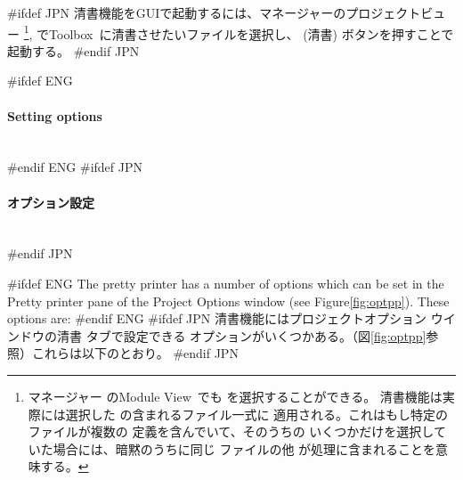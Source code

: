 \documentclass[\pformat,12pt]{article}
\newcommand{\Toolbox}{Toolbox}
\newcommand{\vdmModView}{\guicmd{Module View}}
\newcommand{\vdmModView}{\guicmd{モジュールビュー}}
\newcommand{\Toolbox}{Toolbox}
\newcommand{\vdmModView}{\guicmd{VDM View}}
\newcommand{\vdmModView}{\guicmd{VDMビュー}}
\newcommand{\subsubsubsection}[1]{\paragraph{#1}\mbox{}\\}
\newcommand{\guicmd}[1]{{\sf #1}}
\newcommand{\guicmd}[1]{{\gt #1}}
\begin{document}
#ifdef JPN
清書機能をGUIで起動するには、\guicmd{マネージャー}の\guicmd{プロジェクトビュー} %
\footnote{%
  \guicmd{マネージャー} の\vdmModView\ でも
  を選択することができる。
  清書機能は実際には選択した
  の含まれるファイル一式に
  適用される。これはもし特定のファイルが複数の
   定義を含んでいて、そのうちの
  いくつかだけを選択していた場合には、暗黙のうちに同じ
  ファイルの他  が処理に含まれることを意味する。
},%
で\Toolbox\ に清書させたいファイルを選択し、 
(\guicmd{清書}) ボタンを押すことで起動する。
#endif JPN

#ifdef ENG
\subsubsubsection{Setting options}
#endif ENG
#ifdef JPN
\subsubsubsection{オプション設定}
#endif JPN

#ifdef ENG
The pretty printer has a number of options which can be set in the 
\guicmd{Pretty printer} pane of the \guicmd{Project Options} window (see
Figure\ref{fig:optpp}). These options are:
#endif ENG
#ifdef JPN
清書機能には\guicmd{プロジェクトオプション} ウインドウの\guicmd{清書} タブで設定できる
オプションがいくつかある。（図\ref{fig:optpp}参照）これらは以下のとおり。
#endif JPN
\end{document}
